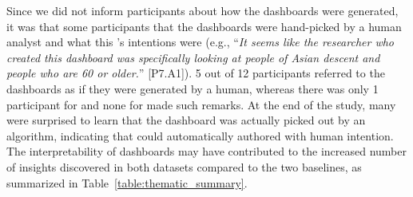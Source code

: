 \par Since we did not inform participants about how the dashboards were generated, it was  that some participants  that the dashboards were hand-picked by a human analyst and  what this 's intentions were (e.g., ``\textit{It seems like the researcher who created this dashboard was specifically looking at people of Asian descent and people who are 60 or older.}'' [P7.A1]).  5 out of 12 participants referred to the \system dashboards as if they were generated by a human, whereas there was only 1 participant for \cluster and none for \BFS made such remarks. At the end of the study, many were surprised to learn that the \system dashboard was actually picked out by an algorithm, indicating that \system could automatically  authored with human intention. The interpretability of \system dashboards may have contributed to the increased number of insights discovered in both datasets compared to the two baselines, as summarized in Table~\ref{table:thematic_summary}.
